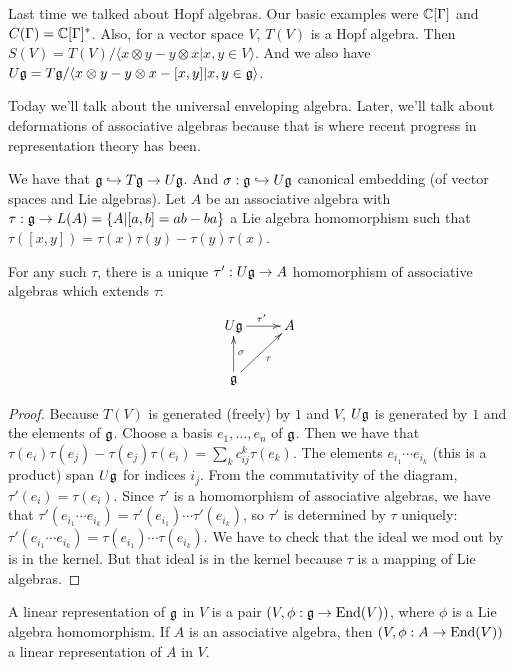  \setcounter{lecture}{7}

 Last time we talked about Hopf algebras. Our basic examples were $\mathbb{C}[\Gamma]$ and
 $C(\Gamma)=\mathbb{C}[\Gamma]^*$. Also, for a vector space $V$, $T(V)$ is a Hopf algebra.
 Then $S(V)=T(V)/\langle x\otimes y-y\otimes x|x,y\in V\rangle$. And we also have $U\mathfrak{g}
 = T\mathfrak{g}/\langle x\otimes y-y\otimes x-[x,y]|x,y\in \mathfrak{g}\rangle$.

 Today we'll talk about the universal enveloping algebra. Later, we'll talk about
 deformations of associative algebras because that is where recent progress in
 representation theory has been.

  We have that
 $\mathfrak{g}\hookrightarrow T\mathfrak{g}\to U\mathfrak{g}$. And $\sigma :\mathfrak{g}\hookrightarrow U\mathfrak{g}$ canonical
 embedding (of vector spaces and Lie algebras). Let $A$ be an associative algebra with
 $\tau:\mathfrak{g}\to L(A)=\{A|[a,b]=ab-ba\}$ a Lie algebra homomorphism such that
 $\tau([x,y])=\tau(x)\tau(y)-\tau(y)\tau(x)$.
 \begin{proposition}\label{lec07P:Ug}
   For any such $\tau$, there is a unique $\tau':U\mathfrak{g}\to A$ homomorphism of associative
   algebras which extends $\tau$:
   \[\xymatrix{
    U\g \ar[r]^{\tau'} & A\\
    \g\ar[u]_\sigma \ar[ur]_\tau
   }\]
 \end{proposition}
 \begin{proof}
   Because $T(V)$ is generated (freely) by $1$ and $V$, $U\mathfrak{g}$ is generated by $1$ and
   the elements of $\mathfrak{g}$. Choose a basis $e_1,\dots,e_n$ of $\mathfrak{g}$. Then we have that
   $\tau(e_i)\tau(e_j)-\tau(e_j)\tau(e_i)=\sum_k c^k_{ij} \tau(e_k)$. The   elements
   $e_{i_1}\cdots e_{i_k}$ (this is a product) span $U\mathfrak{g}$ for indices $i_j$. From the
   commutativity of the diagram, $\tau'(e_i)=\tau(e_i)$. Since $\tau'$ is a
   homomorphism of associative algebras, we have that $\tau'(e_{i_1}\cdots
   e_{i_k})=\tau'(e_{i_1})\cdots \tau'(e_{i_k})$, so $\tau'$ is determined by $\tau$
   uniquely: $\tau'(e_{i_1}\cdots e_{i_k})=\tau(e_{i_1})\cdots \tau(e_{i_k})$. We have
   to check that the ideal we mod out by is in the kernel. But that ideal is in the
   kernel because $\tau$ is a mapping of Lie algebras.
 \end{proof}
 \begin{definition} A linear representation
 of $\mathfrak{g}$ in $V$ is a pair $(V, \phi: \mathfrak{g}\to \operatorname{End}(V))$, where $\phi$ is a Lie algebra
 homomorphism. If $A$ is an associative algebra, then  $(V, \phi:A\to \operatorname{End}(V))$ a
 linear representation of $A$ in $V$.
 \end{definition}
